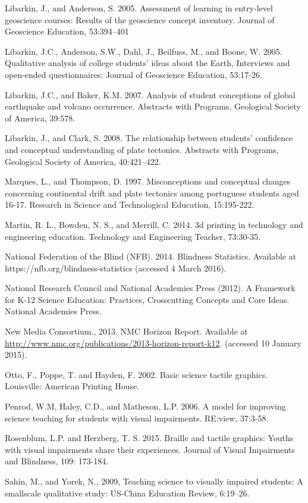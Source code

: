 \documentclass[11.5pt]{sig-alternate} %
\begin{document}
Libarkin, J., and Anderson, S. 2005. Assessment of learning in entry-level geoscience courses:  Results of the geoscience concept inventory.  Journal of Geoscience Education, 53:394–401

Libarkin, J.C., Anderson, S.W., Dahl, J., Beilfuss, M., and Boone, W. 2005. Qualitative analysis of college students' ideas about the Earth, Interviews and open-ended questionnaires: Journal of Geoscience Education, 53:17-26.

Libarkin, J.C., and Baker, K.M. 2007. Analysis of student conceptions of global
earthquake and volcano occurrence. Abstracts with Programs, Geological Society of America, 39:578.

Libarkin, J., and Clark, S. 2008. The relationship between students’ confidence and conceptual understanding of plate tectonics. Abstracts with Programs, Geological Society of America, 40:421–422.

Marques, L., and Thompson, D. 1997. Misconceptions and conceptual changes 
concerning continental drift and plate tectonics among portuguese students aged 16-17. Research in Science and Technological Education, 15:195-222.

Martin, R. L., Bowden, N. S., and Merrill, C. 2014. 3d printing in technology and engineering education. Technology and Engineering Teacher, 73:30-35.

National Federation of the Blind (NFB). 2014.  Blindness Statistics. Available at   https://nfb.org/blindness-statistics (accessed 4 March 2016).

National Research Council and National Academies Press (2012).   A Framework for K-12 Science Education: Practices, Crosscutting Concepts and Core Ideas.  National Academies Press.

New Media Consortium., 2013.  NMC Horizon Report.  Available at \url{http://www.nmc.org/publications/2013-horizon-report-k12}. (accessed 10 January 2015). 

Otto, F., Poppe, T. and Hayden, F. 2002.  Basic science tactile graphics.  Louisville:  American Printing House.

Penrod, W.M, Haley, C.D., and Matheson, L.P. 2006.  A model for improving science teaching for students with visual impairments.  RE:view, 37:3-58.

Rosenblum, L.P. and Herzberg, T. S. 2015.  Braille and tactile graphics:  Youths with visual impairments share their experiences.  Journal of Visual Impairments and Blindness, 109: 173-184.  

Sahin, M., and Yorek, N., 2009, Teaching science to visually impaired students: A smallscale qualitative study: US-China Education Review, 6:19–26.
\end{document}
